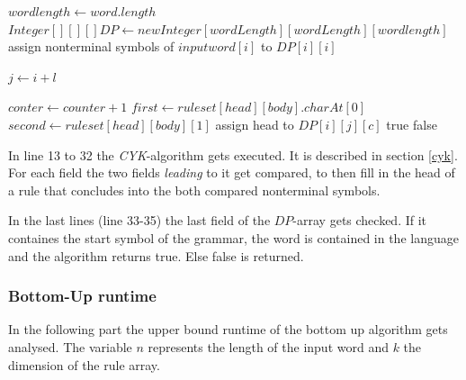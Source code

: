\documentclass[a4paper, 11pt]{article}
\begin{document}
\begin{center}
\label{alg:cap}
\begin{algorithmic}[1]
\State $wordlength \gets word.length$ 
\State $Integer[][][] DP \gets new Integer[wordLength][wordLength][wordlength]$
\State assign nonterminal symbols of $inputword[i]$ to $DP[i][i]$
\EndIf
\EndFor

\State $j \gets i + l$

\State $conter \gets counter + 1$
\State $first \gets ruleset[head][body].charAt[0]$
\State $second \gets ruleset[head][body][1]$
\State assign head to $DP[i][j][c]$\footnotemark
\EndIf
\EndIf
\EndFor
\EndFor
\EndFor
\EndFor
\EndFor
{}
\State \Return true
\EndIf
\State \Return false
\end{algorithmic}
\hrulefill
\end{center}

In line 13 to 32 the \textit{CYK}-algorithm gets executed. It is described in section \ref{cyk}. For each field the two fields \textit{leading} to it get compared, to then fill in the head of a rule that concludes into the both compared nonterminal symbols.


In the last lines (line 33-35) the last field of the $DP$-array gets checked. If it containes the start symbol of the grammar, the word is contained in the language and the algorithm returns true. Else false is returned.




\subsubsection{Bottom-Up runtime}
\label{bottomupruntime}

In the following part the upper bound runtime of the bottom up algorithm gets analysed.
The variable $n$ represents the length of the input word and $k$ the dimension of the rule array.
\end{document}
